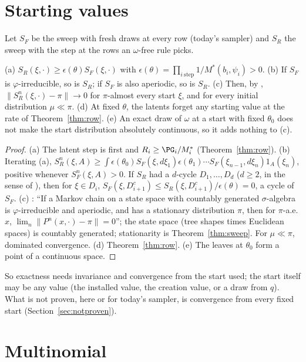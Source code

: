 \section{Starting values}\label{sec:starts}

Let $S_F$ be the sweep with fresh draws at every row (today's sampler) and $S_R$ the sweep with the step at the rows
an $\omega$-free rule picks.

\begin{theorem}\label{thm:starts}
(a) $S_R(\xi,\cdot)\ge\epsilon(\theta)S_F(\xi,\cdot)$ with $\epsilon(\theta)=\prod_{i\ \mathrm{step}}1/M^*(b_i,
\psi_i)>0$. (b) If $S_F$ is $\varphi$-irreducible, so is $S_R$; if $S_F$ is also aperiodic, so is $S_R$. (c) Then,
by \cite[Thm.~4]{rr}, $\|S_R^n(\xi,\cdot)-\pi\|\to0$ for $\pi$-almost every start $\xi$, and for every initial
distribution $\mu\ll\pi$. (d) At fixed $\theta$, the latents forget any starting value at the rate of
Theorem~\ref{thm:row}. (e) An exact draw of $\omega$ at a start with fixed $\theta_0$ does not make the start
distribution absolutely continuous, so it adds nothing to (c).
\end{theorem}
\begin{proof}
(a) The latent step is first and $R_i\ge\PG_i/M^*_i$ (Theorem~\ref{thm:row}). (b) Iterating (a),
$S_R^n(\xi,A)\ge\int\epsilon(\theta_0)S_F(\xi,d\xi_1)\epsilon(\theta_1)\cdots S_F(\xi_{n-1},d\xi_n)1_A(\xi_n)$,
positive whenever $S_F^n(\xi,A)>0$. If $S_R$ had a $d$-cycle $D_1,\dots,D_d$ ($d\ge2$, in the sense of
\cite[Sec.~3]{rr}), then for $\xi\in D_i$, $S_F(\xi,D_{i+1}^c)\le S_R(\xi,D_{i+1}^c)/\epsilon(\theta)=0$, a cycle of
$S_F$. (c) \cite[Thm.~4]{rr}: ``If a Markov chain on a state space with countably generated $\sigma$-algebra is
$\varphi$-irreducible and aperiodic, and has a stationary distribution $\pi$, then for $\pi$-a.e. $x$,
$\lim_n\|P^n(x,\cdot)-\pi\|=0$''; the state space (tree shapes times Euclidean spaces) is countably generated;
stationarity is Theorem~\ref{thm:sweep}. For $\mu\ll\pi$, dominated convergence. (d) Theorem~\ref{thm:row}.
(e) The leaves at $\theta_0$ form a point of a continuous space.
\end{proof}

So exactness needs invariance and convergence from the start used; the start itself may be any value (the
installed value, the creation value, or a draw from $q$). What is not proven, here or for today's sampler, is
convergence from every fixed start (Section~\ref{sec:notproven}).

\section{Multinomial}\label{sec:multi}


